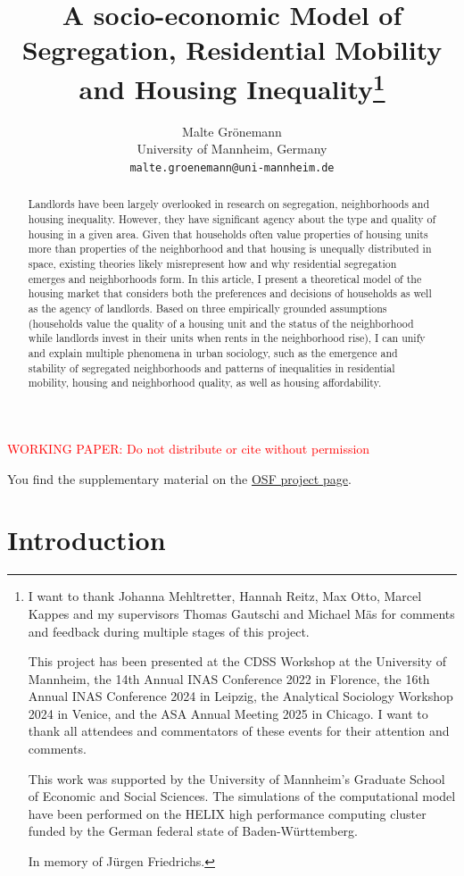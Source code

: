 \documentclass[a4paper,12pt]{article}
\title{A socio-economic Model of Segregation, Residential Mobility and Housing Inequality\footnote{
I want to thank Johanna Mehltretter, Hannah Reitz, Max Otto, Marcel Kappes and my supervisors Thomas Gautschi and Michael Mäs for comments and feedback during multiple stages of this project.

This project has been presented at the CDSS Workshop at the University of Mannheim, the 14th Annual INAS Conference 2022 in Florence, the 16th Annual INAS Conference 2024 in Leipzig, the Analytical Sociology Workshop 2024 in Venice, and the ASA Annual Meeting 2025 in Chicago. I want to thank all attendees and commentators of these events for their attention and comments.

This work was supported by the University of Mannheim’s Graduate School of Economic and Social Sciences. The simulations of the computational model have been performed on the HELIX high performance computing cluster funded by the German federal state of Baden-Württemberg.

In memory of Jürgen Friedrichs.}}
\author{Malte Grönemann \\ University of Mannheim, Germany \\ \texttt{malte.groenemann@uni-mannheim.de}}
\begin{document}
\maketitle

\textcolor{red}{WORKING PAPER: Do not distribute or cite without permission}

You find the supplementary material on the \href{https://osf.io/nqazw/?view_only=5d2358955d9542de921be4966ffe006c}{OSF project page}.

\begin{abstract} 
Landlords have been largely overlooked in research on segregation, neighborhoods and housing inequality. However, they have significant agency about the type and quality of housing in a given area. Given that households often value properties of housing units more than properties of the neighborhood and that housing is unequally distributed in space, existing theories likely misrepresent how and why residential segregation emerges and neighborhoods form. In this article, I present a theoretical model of the housing market that considers both the preferences and decisions of households as well as the agency of landlords. Based on three empirically grounded assumptions (households value the quality of a housing unit and the status of the neighborhood while landlords invest in their units when rents in the neighborhood rise), I can unify and explain multiple phenomena in urban sociology, such as the emergence and stability of segregated neighborhoods and patterns of inequalities in residential mobility, housing and neighborhood quality, as well as housing affordability.
\end{abstract}


\newpage

\section{Introduction}
\end{document}
